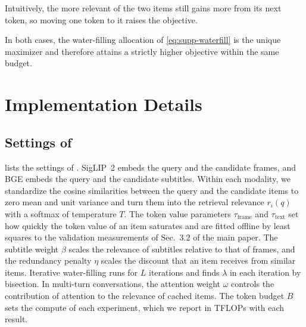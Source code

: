 \noindent Intuitively, the more relevant of the two items still gains more from its next token, so moving one token to it raises the objective.

In both cases, the water-filling allocation of \cref{eq:supp-waterfill} is the unique maximizer and therefore attains a strictly higher objective within the same budget.

\section{Implementation Details}
\label{sec:supp-impl}

\subsection{Settings of \name}
\label{sec:supp-settings}

 lists the settings of \name. SigLIP~2 embeds the query and the candidate frames, and BGE embeds the query and the candidate subtitles. Within each modality, we standardize the cosine similarities between the query and the candidate items to zero mean and unit variance and turn them into the retrieval relevance $r_i(q)$ with a softmax of temperature $T$. The token value parameters $\tau_{\text{frame}}$ and $\tau_{\text{text}}$ set how quickly the token value of an item saturates and are fitted offline by least squares to the validation measurements of Sec.~3.2 of the main paper. The subtitle weight $\beta$ scales the relevance of subtitles relative to that of frames, and the redundancy penalty $\eta$ scales the discount that an item receives from similar items. Iterative water-filling runs for $L$ iterations and finds $\lambda$ in each iteration by bisection. In multi-turn conversations, the attention weight $\omega$ controls the contribution of attention to the relevance of cached items. The token budget $B$ sets the compute of each experiment, which we report in TFLOPs with each result.

